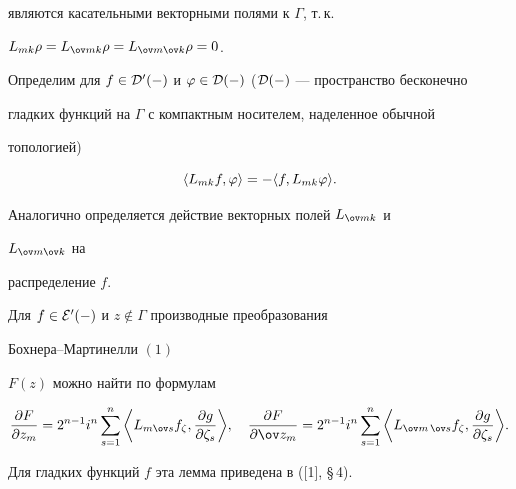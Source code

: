 являются касательными векторными полями к $\Gamma$, т.\,к. 


$L_{mk}\rho=L_{\ov mk}\rho=L_{\ov m\ov k}\rho=0$. 


Определим для $f\in\cal D'(\Gamma)$ и $\varphi\in\cal D(\Gamma)$ ($\cal 


D(\Gamma)$ --- пространство бесконечно 


гладких функций на $\Gamma$ с компактным носителем, наделенное обычной 


топологией) 


$$ 


\la L_{mk}f,\varphi\ra=-\la f,L_{mk}\varphi\ra. 


$$ 


Аналогично определяется действие векторных полей $L_{\ov mk}$ и 


$L_{\ov m\ov k}$ на 


распределение $f$. 


 


\begin{lem} 


Для $f\in\cal E'(\Gamma)$ и $z\notin\Gamma$ производные преобразования 


Бохнера--Мартинелли $(1)$ 


$F(z)$ можно найти по формулам 


$$ 


\frac{\partial F}{\partial z_m}=2^{n-1}i^n\sum^n_{s=1} 


\bigg\la L_{m\ov s}f_\zeta, 


\frac{\partial g}{\partial \zeta_s}\bigg\ra,\quad 


\frac{\partial F}{\partial \ov z_m}=2^{n-1}i^n\sum^n_{s=1} 


\bigg\la L_{\ov m\,\ov s}f_\zeta, 


\frac{\partial g}{\partial \zeta_s}\bigg\ra. 


$$ 


\end{lem} 


 


Для гладких функций $f$ эта лемма приведена в ([1], \S\,4). 


 


